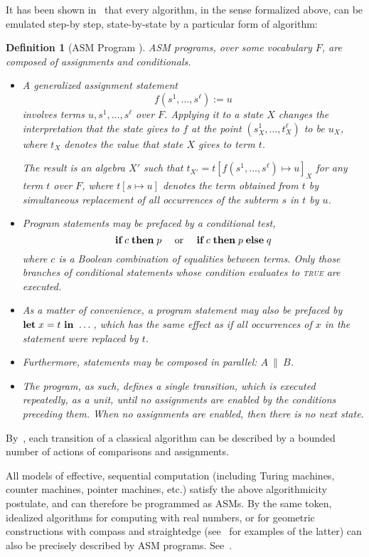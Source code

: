 \documentclass[submission,copyright,creativecommons,english]{eptcs}
\newtheorem{definition}[theorem]{Definition}
\newcommand{\F}{{F}}
\newcommand{\IN}{\mbox{~\bf in~}}
\newcommand{\LET}{\mbox{\bf let}\;}
\newcommand{\IF}{\mbox{\bf if}\;}
\newcommand{\THEN}{\;\mbox{\bf then}\;}
\newcommand{\ELSE}{\;\mbox{\bf else}\;}
\newcommand{\True}{\textsc{true}}
\begin{document}
It has been shown in~\cite{ASM-Theorem-Gurevich} that every algorithm, in the sense formalized above, can be emulated step-by step, state-by-state by a particular form of algorithm:

\begin{definition}[ASM Program \cite{Lipari}]\label{def:asm} \emph{ASM
programs}, over some vocabulary $F$, are composed of assignments and
conditionals. 
\begin{itemize}
\item A generalized \emph{assignment} statement $$f(s^{1},\ldots,s^\ell):=u$$ involves
terms $u,s^{1},\ldots,s^\ell$ over $\F$. Applying it to a state $X$
changes the interpretation that the state gives to $f$ at the point
$(s_{X}^{1},\ldots,t_{X}^\ell)$ to be $u_{X}$, where $t_X$ denotes the value
that state $X$ gives to term $t$.
\begin{ignore}
The result is an algebra
$X'$ such that $t_{X'}=t[f(s^{1},\ldots,s^\ell)\mapsto u]_{X}$ for any
term $t$ over $\F$, where $t[s\mapsto u]$ denotes the term obtained from
$t$ by simultaneous replacement of all occurrences of the subterm
$s$ in $t$ by $u$. 
\end{ignore}
\item Program statements may be prefaced by a \emph{conditional} test, $$\IF c\THEN p \mbox{\rm ~~~~or~~~~}
\IF c\THEN p\ELSE q$$
where $c$ is a Boolean combination of
equalities between terms.
Only those branches of conditional statements whose condition evaluates to \True{} 
are executed. 
\item
{As a matter of convenience, a program statement may also be prefaced by $\LET x=t \IN\dots$,
which has the same effect as if  all occurrences of $x$ in the statement were replaced by $t$.}
\item Furthermore, statements may be composed in \emph{parallel:} $A~\|~B$.
\item The program, as such, defines a single transition, which is executed repeatedly,
as a unit, until no assignments are enabled by the conditions preceding them. When no assignments are
enabled, then there is no next state. 
\end{itemize}
\end{definition}

By~\cite{ASM-Theorem-Gurevich},
each transition of a classical algorithm can be described by a  bounded number of actions of comparisons and assignments.

All models of effective, sequential computation
(including Turing machines, counter machines, pointer machines, etc.)
satisfy the above algorithmicity postulate, and can therefore be programmed as ASMs.
By the same token,
 idealized algorithms for computing with real numbers, or for geometric constructions
with compass and straightedge
(see~\cite{Reisig04} for examples of the latter)
can also be precisely described by ASM programs.
See~\cite{Generic}.
\end{document}
